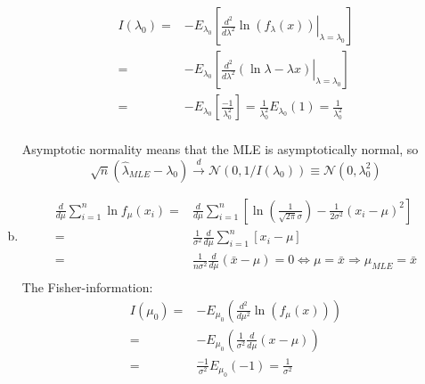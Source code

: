\documentclass{article}
\begin{document}
\begin{enumerate}[(a)]
          \[\begin{aligned}
                  I({\lambda _0}) = & - {E_{{\lambda _0}}}\left[ {{{\left. {\frac{{{d^2}}}{{d{\lambda ^2}}}\ln \left( {{f_\lambda }(x)} \right)} \right|}_{\lambda  = {\lambda _0}}}} \right]      \\
                  =                 & - {E_{{\lambda _0}}}\left[ {{{\left. {\frac{{{d^2}}}{{d{\lambda ^2}}}\left( {\ln \lambda  - \lambda x} \right)} \right|}_{\lambda  = {\lambda _0}}}} \right] \\
                  =                 & - {E_{{\lambda _0}}}\left[ {\frac{{ - 1}}{{\lambda _0^2}}} \right] = \frac{1}{{\lambda _0^2}}{E_{{\lambda _0}}}\left( 1 \right) = \frac{1}{{\lambda _0^2}}   \\
              \end{aligned} \]

          Asymptotic normality means that the MLE is asymptotically normal, so
          \[
              \sqrt{n}(\hat{\lambda}_{MLE} - \lambda_0) \xrightarrow{d} \mathcal N(0, 1/I(\lambda_0)) \equiv \mathcal N(0, \lambda_0^2)
          \]
    \item
          \[\begin{aligned}
                  \frac{d}{{d\mu }}\sum\limits_{i = 1}^n {\ln {f_\mu }\left( {{x_i}} \right)}  = & \frac{d}{{d\mu }}\sum\limits_{i = 1}^n {\left[ {\ln \left( {\frac{1}{{\sqrt {2\pi } \sigma }}} \right) - \frac{1}{{2{\sigma ^2}}}{{\left( {{x_i} - \mu } \right)}^2}} \right]} \\
                  =                                                                              & \frac{1}{{{\sigma ^2}}}\frac{d}{{d\mu }}\sum\limits_{i = 1}^n {\left[ {{x_i} - \mu } \right]}                                                                                  \\
                  =                                                                              & \frac{1}{{n{\sigma ^2}}}\frac{d}{{d\mu }}\left( {\bar x - \mu } \right) = 0 \Leftrightarrow \mu  = \bar x \Rightarrow {\mu _{MLE}} = \bar x                                    \\
              \end{aligned} \]
          The Fisher-information:
          \[\begin{aligned}
                  I\left( {{\mu _0}} \right) = & - {E_{{\mu _0}}}\left( {\frac{{{d^2}}}{{d{\mu ^2}}}\ln \left( {{f_\mu }\left( x \right)} \right)} \right) \\
                  =                            & - {E_{{\mu _0}}}\left( {\frac{1}{{{\sigma ^2}}}\frac{d}{{d\mu }}\left( {x - \mu } \right)} \right)        \\
                  =                            & \frac{{ - 1}}{{{\sigma ^2}}}{E_{{\mu _0}}}\left( { - 1} \right) = \frac{1}{{{\sigma ^2}}}                 \\
              \end{aligned} \]


\end{enumerate}
\end{document}
